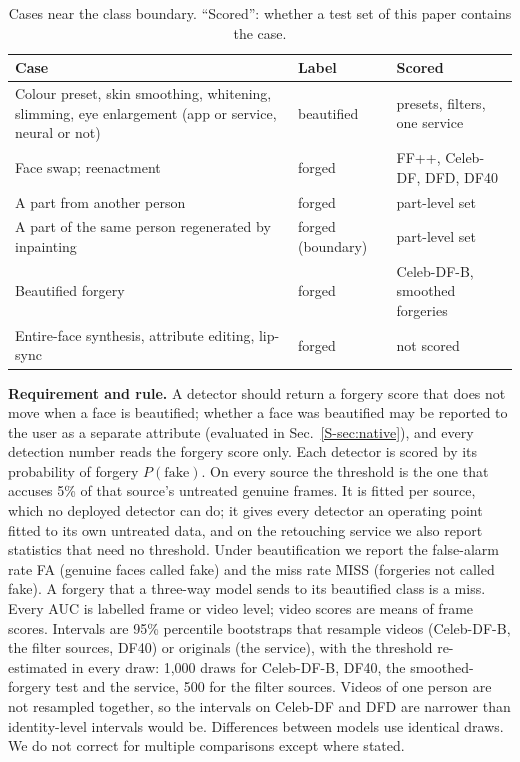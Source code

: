 \documentclass[conference]{IEEEtran}
\begin{document}
\begin{table}[t]
\centering
\caption{Cases near the class boundary. ``Scored'': whether a test set of this paper contains the case.}
\label{tab:boundary}
\footnotesize
\setlength{\tabcolsep}{2.5pt}
\begin{tabular}{@{}>{\raggedright\arraybackslash}p{}>{\raggedright\arraybackslash}p{}>{\raggedright\arraybackslash}p{}@{}}
\toprule
Case & Label & Scored \\
\midrule
Colour preset, skin smoothing, whitening, slimming, eye enlargement (app or service, neural or not) & beautified & presets, filters, one service \\
Face swap; reenactment & forged & FF++, Celeb-DF, DFD, DF40 \\
A part from another person & forged & part-level set \\
A part of the same person regenerated by inpainting & forged (boundary) & part-level set \\
Beautified forgery & forged & Celeb-DF-B, smoothed forgeries \\
Entire-face synthesis, attribute editing, lip-sync & forged & not scored \\
\bottomrule
\end{tabular}
\end{table}

\textbf{Requirement and rule.} A detector should return a forgery score that does not move when a face is beautified; whether a
face was beautified may be reported to the user as a separate attribute (evaluated in Sec.~\ref{S-sec:native}), and every
detection number reads the forgery score only. Each detector is
scored by its probability of forgery $P(\text{fake})$. On every source the threshold is the one that accuses 5\% of that
source's untreated genuine frames. It is fitted per source, which no deployed detector can do; it gives every detector an operating
point fitted to its own untreated data, and on the retouching service we also report statistics that need no threshold. Under
beautification we report the false-alarm rate FA (genuine faces called fake) and the miss rate MISS (forgeries not called
fake). A forgery that a three-way model sends to its beautified class is a miss. Every AUC is labelled frame or video level;
video scores are means of frame scores. Intervals are 95\% percentile bootstraps that resample videos (Celeb-DF-B, the filter
sources, DF40) or originals (the service), with the threshold re-estimated in every draw: 1,000 draws for Celeb-DF-B, DF40,
the smoothed-forgery test and the service, 500 for the filter sources. Videos of one person are not resampled together, so the
intervals on Celeb-DF and DFD are narrower than identity-level intervals would be. Differences between models use identical
draws. We do not correct for multiple comparisons except where stated.
\end{document}
